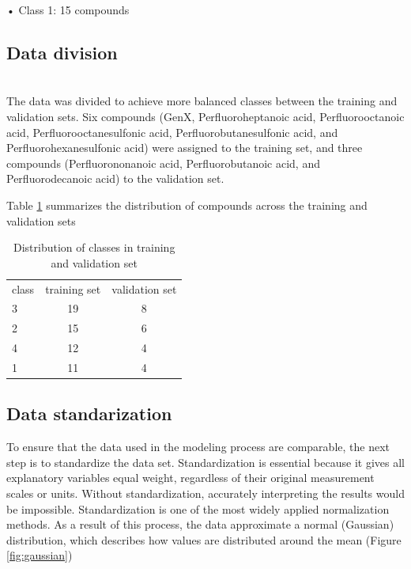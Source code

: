 •	Class 1: 15 compounds


\subsection{Data division}\\

The data was divided to achieve more balanced classes between the training and validation sets. Six compounds (GenX, Perfluoroheptanoic acid, Perfluorooctanoic acid, Perfluorooctanesulfonic acid, Perfluorobutanesulfonic acid, and Perfluorohexanesulfonic acid) were assigned to the training set, and three compounds (Perfluorononanoic acid, Perfluorobutanoic acid, and Perfluorodecanoic acid) to the validation set. 


Table \ref{tab:train_test_class_distribution} summarizes the distribution of compounds across the training and validation sets


\begin{table}[H]
    \centering
    \caption{Distribution of classes in training and validation set}
    \begin{tabular}{lcc}
         
 class&training set&  validation set\\
         
 3&19&  8\\
         
 2&15&  6\\
         
 4&12&  4\\
          1&11&  4\\
    \end{tabular}
    \label{tab:train_test_class_distribution}
\end{table}

\subsection{Data standarization}
To ensure that the data used in the modeling process are comparable, the next step is to standardize the data set. Standardization is essential because it gives all explanatory variables equal weight, regardless of their original measurement scales or units. Without standardization, accurately interpreting the results would be impossible. Standardization is one of the most widely applied normalization methods. As a result of this process, the data approximate a normal (Gaussian) distribution, which describes how values are distributed around the mean (Figure \ref{fig:gaussian}) \cite{GuhaR}\cite{KumarA}\cite{ZhangX}

